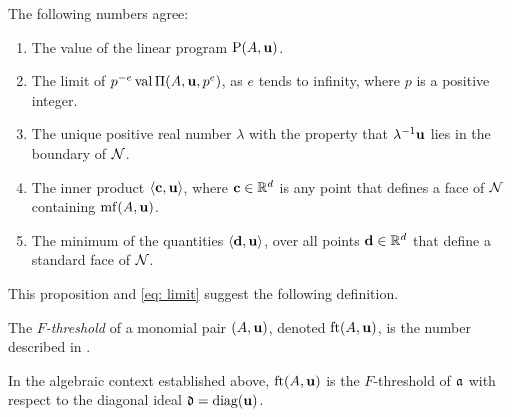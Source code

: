\documentclass[11pt]{amsart}
\begin{document}

\begin{proposition}
   \label{FT descriptions: P}
   The following numbers agree\textup:
   \begin{enumerate}
      \item\label{value} The value of the linear program $\mathrm{P}(A, \mathbf{u})$.
      \item\label{limit} The limit of $p^{-e}\operatorname{val} \Pi(A,\mathbf{u},p^e)$, as $e$ tends to infinity, where $p$ is a positive integer.
      \item\label{lambda} The unique positive real number $\lambda$ with the property that $\lambda^{-1}\mathbf{u}$ lies in the boundary of $\mathcal{N}$.
      \item\label{ip} The inner product $\langle \mathbf{c}, \mathbf{u} \rangle$, where $\mathbf{c} \in \mathbb{R}^d$ is any point that defines a face of $\mathcal{N}$ containing $\operatorname{mf}(A, \mathbf{u})$.
      \item\label{min ip} The minimum of the quantities $\langle \mathbf{d}, \mathbf{u} \rangle$, over all points $\mathbf{d} \in \mathbb{R}^d$ that define a standard face of $\mathcal{N}$.
   \end{enumerate}
\end{proposition}

This proposition and \eqref{eq: limit} suggest the following definition.

\begin{definition}
   The \emph{$F$-threshold} of a monomial pair $(A, \mathbf{u})$, denoted $\operatorname{ft}(A, \mathbf{u})$, is the number described in . 
\end{definition}

In the algebraic context established above, $\operatorname{ft}(A, \mathbf{u})$ is the $F$-threshold of $\mathfrak{a}$ with respect to the diagonal ideal $\mathfrak{d} = \operatorname{diag}(\mathbf{u})$.
\end{document}
